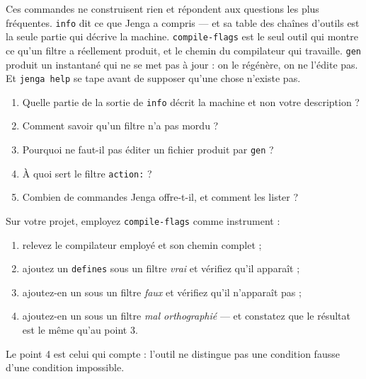 \begin{nkbilan}
Ces commandes ne construisent rien et répondent aux questions les plus fréquentes.
\texttt{info} dit ce que Jenga a compris --- et sa table des chaînes d'outils est
la seule partie qui décrive la machine. \texttt{compile-flags} est le seul outil
qui montre ce qu'un filtre a réellement produit, et le chemin du compilateur qui
travaille. \texttt{gen} produit un instantané qui ne se met pas à jour : on le
régénère, on ne l'édite pas. Et \texttt{jenga help} se tape avant de supposer
qu'une chose n'existe pas.
\end{nkbilan}

\begin{nkquestions}
\begin{enumerate}
\item Quelle partie de la sortie de \texttt{info} décrit la machine et non votre
      description ?
\item Comment savoir qu'un filtre n'a pas mordu ?
\item Pourquoi ne faut-il pas éditer un fichier produit par \texttt{gen} ?
\item À quoi sert le filtre \texttt{action:} ?
\item Combien de commandes Jenga offre-t-il, et comment les lister ?
\end{enumerate}
\end{nkquestions}

\begin{nkpratique}
Sur votre projet, employez \texttt{compile-flags} comme instrument :

\begin{enumerate}
\item relevez le compilateur employé et son chemin complet ;
\item ajoutez un \texttt{defines} sous un filtre \emph{vrai} et vérifiez qu'il
      apparaît ;
\item ajoutez-en un sous un filtre \emph{faux} et vérifiez qu'il n'apparaît pas ;
\item ajoutez-en un sous un filtre \emph{mal orthographié} --- et constatez que
      le résultat est le même qu'au point 3.
\end{enumerate}

Le point 4 est celui qui compte : l'outil ne distingue pas une condition fausse
d'une condition impossible.
\end{nkpratique}

